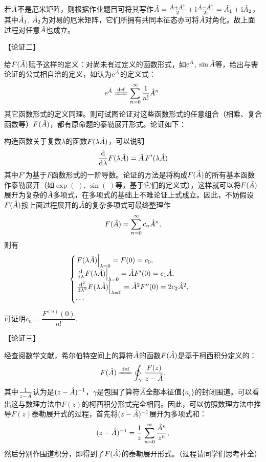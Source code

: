 \begin{enumerate}[label=2.\Alph*, leftmargin=-0.5mm]
若$\hat{A}$不是厄米矩阵，则根据作业题目可将其写作$\hat{A} = \frac{\hat{A}+\hat{A}^\dagger}{2}+\mathrm{i}\frac{\hat{A}-\hat{A}^\dagger}{2\mathrm{i}}=\hat{A}_1+\mathrm{i} \hat{A}_2$，其中$\hat{A}_1$, $\hat{A}_2$为对易的厄米矩阵，它们所拥有共同本征态亦可将$\hat{A}$对角化。故上面过程对任意$\hat{A}$也成立。

【论证二】

给$F(\hat{A})$赋予这样的定义：对尚未有过定义的函数形式，如$\mathrm{e}^{\hat{A}}$, $\sin\hat{A}$等，给出与需论证的公式相自洽的定义，如认为$\mathrm{e}^{\hat{A}}$的定义式：
\[\ee{\hA}  \xlongequal{\mathrm{def}} \sum_{n=0}^{\infty}\frac{1}{n!}\hA^n.\]
其它函数形式的定义同理。则可试图论证对这些函数形式的任意组合（相乘、复合函数等）$F(\hat{A})$，都有原命题的泰勒展开形式。论证如下：

构造函数关于复数$\lambda$的函数$F(\lambda\hat{A})$，可以说明
\[\dv{\lambda}F(\lambda\hat{A}) = \hat{A}\,F'(\lambda\hat{A})\]
其中$F'$为基于$F$函数形式的一阶导数。论证的方法是将构成$F(\hat{A})$的所有基本函数作泰勒展开（如$\exp(\;),\,\sin(\;)$等，基于它们的定义式），这样就可以将$F(\hat{A})$展开为复杂的$\hat{A}$多项式，在多项式的基础上不难论证上式成立。因此，不妨假设$F(\hat{A})$按上面过程展开的$\hat{A}$的复杂多项式可最终整理作
\[F(\hat{A}) = \sum_{n=0}^\infty c_n \hat{A}^n,\]
则有
\[
\begin{cases}
\eval{F(\lambda \hA)}_{\lambda=0} = F(0) =  c_0,\\
\eval{\dv{\lambda}F(\lambda \hA)}_{\lambda=0} = \hA F'(0) = c_1\hA,\\
\eval{\dv[2]{\lambda}F(\lambda \hA)}_{\lambda=0} = \hA^2 F''(0) = 2c_2\hA^2,\\
\cdots
\end{cases}
\]
可证明$c_n = \dfrac{F^{(n)}(0)}{n!}$.

【论证三】

经查阅数学文献，希尔伯特空间上的算符$\hat{A}$的函数$F(\hat{A})$是基于柯西积分定义的：
\[F(\hA)\xlongequal{\mathrm{def}} \oint_\gamma \,\frac{F(z)}{z-\hA},\]
其中$ \frac{1}{z-\hat{A}}$认为是$(z-\hat{A})^{-1}$，$\gamma$是包围了算符$\hat{A}$全部本征值$\{a_i\}$的封闭围道。可以看出这与数理方法中$F(z)$的柯西积分形式完全相同。因此，可以仿照数理方法中推导$F(z)$泰勒展开式的过程，首先将$(z-\hat{A})^{-1}$展开为多项式和：
\[(z-\hat{A})^{-1} = \frac{1}{z}\,\sum_{n=0}^{\infty}\frac{\hat{A}^n}{z^n},\]
然后分别作围道积分，即得到了$F(\hat{A})$的泰勒展开形式。（过程请同学们思考补全）

\end{enumerate}